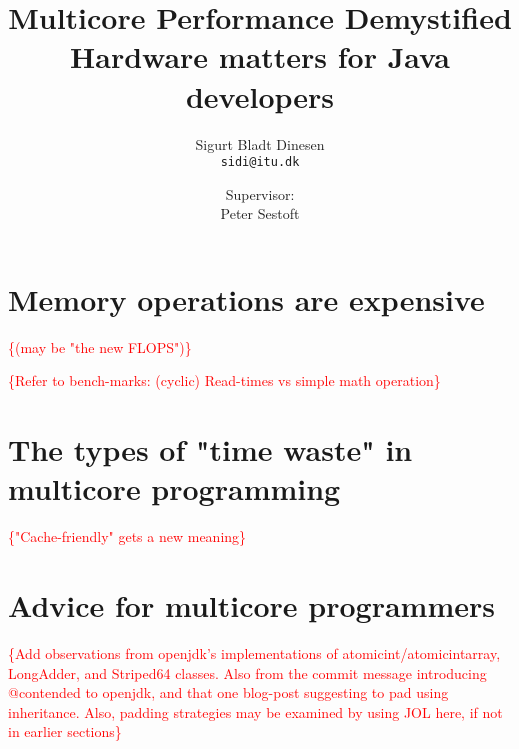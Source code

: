 \documentclass[a4paper, titlepage]{report}
\renewcommand{\%}{\protect\scalebox{.9}{\oldpct}}
\newcommand\mynote[1]{\noindent\textcolor{red}{\{#1\}}}
\begin{document}
\title{Multicore Performance Demystified\\
\hfill \break
\large Hardware matters for Java developers
}
\author{
	Sigurt Bladt Dinesen
	\\\texttt{sidi@itu.dk}
	\and
	Supervisor:
	\\Peter Sestoft
}

\maketitle
\tableofcontents
\clearpage









\chapter{Memory operations are expensive}
\mynote{(may be "the new FLOPS")}

\mynote{Refer to bench-marks: (cyclic) Read-times vs simple math operation}



\chapter{The types of "time waste" in multicore programming}
\mynote{"Cache-friendly" gets a new meaning}



\chapter{Advice for multicore programmers}
\mynote{Add observations from openjdk's implementations of
atomicint/atomicintarray, LongAdder, and Striped64 classes. Also from the commit
message introducing @contended to openjdk, and that one blog-post suggesting to
pad using inheritance. Also, padding strategies may be examined by using JOL
here, if not in earlier sections}

\clearpage
\nocite{*}


\end{document}
